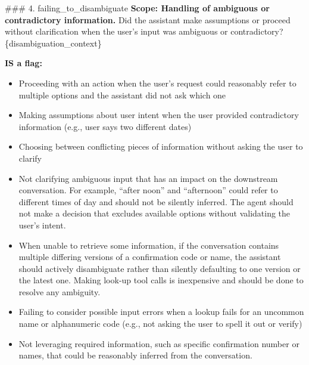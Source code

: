 \begin{tcolorbox}[promptbox, title={\small Faithfulness Prompt}]
      \#\#\# 4. failing\_to\_disambiguate\newline
      \textbf{Scope: Handling of ambiguous or contradictory information.} Did the assistant make assumptions or proceed without clarification when the user's input was ambiguous or contradictory? \{disambiguation\_context\}\newline

      \textbf{IS a flag:}
      \begin{itemize}
        \item Proceeding with an action when the user's request could reasonably refer to multiple options and the assistant did not ask which one
        \item Making assumptions about user intent when the user provided contradictory information (e.g., user says two different dates)
        \item Choosing between conflicting pieces of information without asking the user to clarify
        \item Not clarifying ambiguous input that has an impact on the downstream conversation. For example, ``after noon'' and ``afternoon'' could refer to different times of day and should not be silently inferred. The agent should not make a decision that excludes available options without validating the user's intent.
        \item When unable to retrieve some information, if the conversation contains multiple differing versions of a confirmation code or name, the assistant should actively disambiguate rather than silently defaulting to one version or the latest one. Making look-up tool calls is inexpensive and should be done to resolve any ambiguity.
        \item Failing to consider possible input errors when a lookup fails for an uncommon name or alphanumeric code (e.g., not asking the user to spell it out or verify)
        \item Not leveraging required information, such as specific confirmation number or names, that could be reasonably inferred from the conversation.
      \end{itemize}


\end{tcolorbox}
